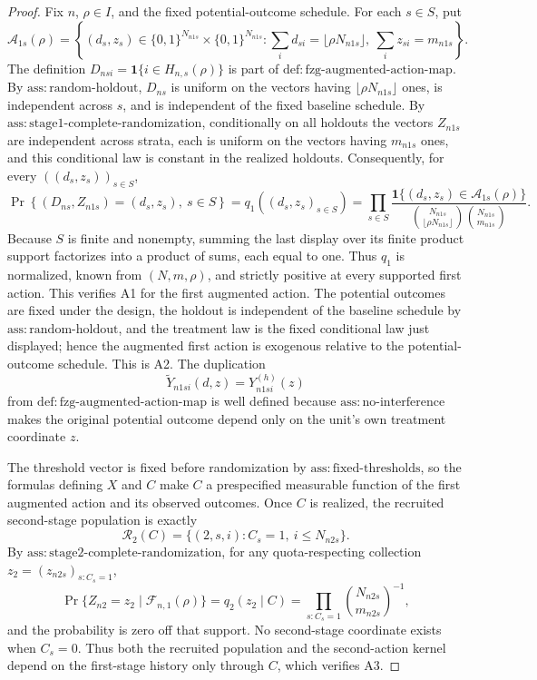 \documentclass{article}
\begin{document}
\begin{proof}
Fix \(n\), \(\rho\in I\), and the fixed potential-outcome schedule.  For each \(s\in S\), put
\[
\mathcal A_{1s}(\rho)=\left\{(d_s,z_s)\in\{0,1\}^{N_{n1s}}\times\{0,1\}^{N_{n1s}}:
\sum_i d_{si}=\lfloor\rho N_{n1s}\rfloor,
\ \sum_i z_{si}=m_{n1s}\right\}.
\]
The definition \(D_{nsi}=\mathbf 1\{i\in H_{n,s}(\rho)\}\) is part of \(\mathrm{def{:}fzg\mbox{-}augmented\mbox{-}action\mbox{-}map}\).  By \(\mathrm{ass{:}random\mbox{-}holdout}\), \(D_{ns}\) is uniform on the vectors having \(\lfloor\rho N_{n1s}\rfloor\) ones, is independent across \(s\), and is independent of the fixed baseline schedule.  By \(\mathrm{ass{:}stage1\mbox{-}complete\mbox{-}randomization}\), conditionally on all holdouts the vectors \(Z_{n1s}\) are independent across strata, each is uniform on the vectors having \(m_{n1s}\) ones, and this conditional law is constant in the realized holdouts.  Consequently, for every \(((d_s,z_s))_{s\in S}\),
\[
\Pr\!\left\{(D_{ns},Z_{n1s})=(d_s,z_s),\ s\in S\right\}
=q_1((d_s,z_s)_{s\in S})
=\prod_{s\in S}
\frac{\mathbf 1\{(d_s,z_s)\in\mathcal A_{1s}(\rho)\}}
{\binom{N_{n1s}}{\lfloor\rho N_{n1s}\rfloor}\binom{N_{n1s}}{m_{n1s}}}.
\]
Because \(S\) is finite and nonempty, summing the last display over its finite product support factorizes into a product of sums, each equal to one.  Thus \(q_1\) is normalized, known from \((N,m,\rho)\), and strictly positive at every supported first action.  This verifies A1 for the first augmented action.  The potential outcomes are fixed under the design, the holdout is independent of the baseline schedule by \(\mathrm{ass{:}random\mbox{-}holdout}\), and the treatment law is the fixed conditional law just displayed; hence the augmented first action is exogenous relative to the potential-outcome schedule.  This is A2.  The duplication
\[
\widetilde Y_{n1si}(d,z)=Y^{(h)}_{n1si}(z)
\]
from \(\mathrm{def{:}fzg\mbox{-}augmented\mbox{-}action\mbox{-}map}\) is well defined because \(\mathrm{ass{:}no\mbox{-}interference}\) makes the original potential outcome depend only on the unit's own treatment coordinate \(z\).

The threshold vector is fixed before randomization by \(\mathrm{ass{:}fixed\mbox{-}thresholds}\), so the formulas defining \(X\) and \(C\) make \(C\) a prespecified measurable function of the first augmented action and its observed outcomes.  Once \(C\) is realized, the recruited second-stage population is exactly
\[
\mathcal R_2(C)=\{(2,s,i):C_s=1,\ i\le N_{n2s}\}.
\]
By \(\mathrm{ass{:}stage2\mbox{-}complete\mbox{-}randomization}\), for any quota-respecting collection \(z_2=(z_{n2s})_{s:C_s=1}\),
\[
\Pr\{Z_{n2}=z_2\mid\mathcal F_{n,1}(\rho)\}
=q_2(z_2\mid C)
=\prod_{s:C_s=1}\binom{N_{n2s}}{m_{n2s}}^{-1},
\]
and the probability is zero off that support.  No second-stage coordinate exists when \(C_s=0\).  Thus both the recruited population and the second-action kernel depend on the first-stage history only through \(C\), which verifies A3.


\end{proof}
\end{document}
